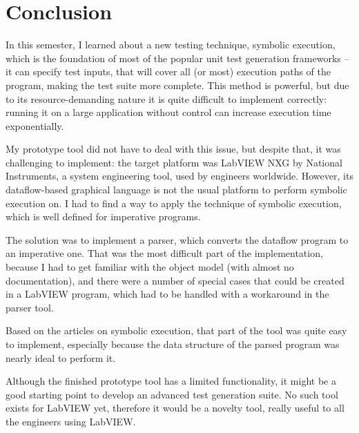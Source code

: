 \chapter{Conclusion}
\label{chap:conclusion}

In this semester, I learned about a new testing technique, symbolic execution, which is the foundation of most of the popular unit test generation frameworks -- it can specify test inputs, that will cover all (or most) execution paths of the program, making the test suite more complete. This method is powerful, but due to its resource-demanding nature it is quite difficult to implement correctly: running it on a large application without control can increase execution time exponentially. 

My prototype tool did not have to deal with this issue, but despite that, it was challenging to implement: the target platform was LabVIEW NXG by National Instruments, a system engineering tool, used by engineers worldwide. However, its dataflow-based graphical language is not the usual platform to perform symbolic execution on. I had to find a way to apply the technique of symbolic execution, which is well defined for imperative programs.

The solution was to implement a parser, which converts the dataflow program to an imperative one. That was the most difficult part of the implementation, because I had to get familiar with the object model (with almost no documentation), and there were a number of special cases that could be created in a LabVIEW program, which had to be handled with a workaround in the parser tool.

Based on the articles on symbolic execution, that part of the tool was quite easy to implement, especially because the data structure of the parsed program was nearly ideal to perform it. 

Although the finished prototype tool has a limited functionality, it might be a good starting point to develop an advanced test generation suite. No such tool exists for LabVIEW yet, therefore it would be a novelty tool, really useful to all the engineers using LabVIEW.